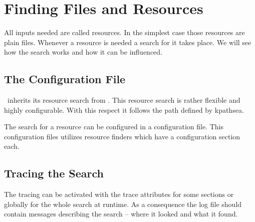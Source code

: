 
\def\LogArg#1{$\langle${\itshape #1}$\rangle$}

\section{Finding Files and Resources}

All inputs needed are called resources. In the simplest case those
resources are plain files. Whenever a resource is needed a search for
it takes place. We will see how the search works and how it can be
influenced.


\subsection{The Configuration File}

\ExBib\ inherits its resource search from \ExTeX{}.
This resource search is rather flexible and highly configurable. With
this respect it follows the path defined by kpathsea.

The search for a resource can be configured in a configuration file.
This configuration files utilizes resource finders which have a
configuration section each.

\INCOMPLETE


\subsection{Tracing the Search}

The tracing can be activated with the trace attributes for some
sections or globally for the whole search at runtime. As a consequence
the log file should contain messages describing the search -- where it
looked and what it found.


